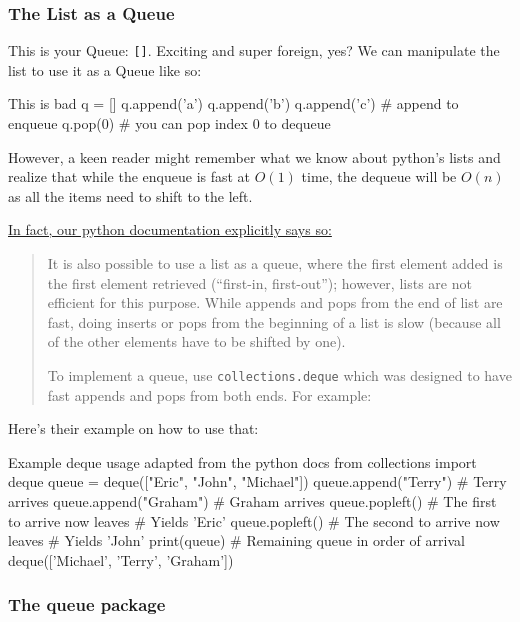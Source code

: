\subsubsection{The List as a Queue}

This is your Queue: \texttt{[]}.  Exciting and super foreign, yes?
We can manipulate the list to use it as a Queue like so:

\begin{pycode}{This is bad}
q = []
q.append('a')
q.append('b')
q.append('c') # append to enqueue
q.pop(0)      # you can pop index 0 to dequeue
\end{pycode}

However, a keen reader might remember what we know about python's lists and realize that while the enqueue is fast at $O(1)$ time, the dequeue will be $O(n)$ as all the items need to shift to the left.  

\href{https://docs.python.org/3/tutorial/datastructures.html#using-lists-as-queues}{In fact, our python documentation explicitly says so:}

\begin{quotation}
It is also possible to use a list as a queue, where the first element added is the first element retrieved (``first-in, first-out''); however, lists are not efficient for this purpose. While appends and pops from the end of list are fast, doing inserts or pops from the beginning of a list is slow (because all of the other elements have to be shifted by one).

To implement a queue, use \texttt{collections.deque} which was designed to have fast appends and pops from both ends. For example:
\end{quotation}


Here's their example on how to use that:
\begin{pycode}{Example deque usage adapted from the python docs}
from collections import deque
queue = deque(["Eric", "John", "Michael"])
queue.append("Terry")           # Terry arrives
queue.append("Graham")          # Graham arrives
queue.popleft()                 # The first to arrive now leaves
								# Yields 'Eric'
queue.popleft()                 # The second to arrive now leaves
                                # Yields 'John'
print(queue)                           # Remaining queue in order of arrival
deque(['Michael', 'Terry', 'Graham'])
\end{pycode}


\subsubsection{The queue package}
